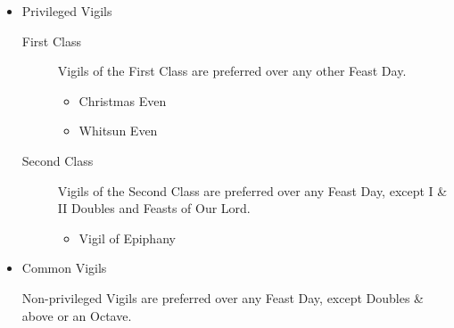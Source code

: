 \begin{itemize}
    \item Privileged Vigils\par
        \begin{description}
            \item[First Class] Vigils of the First Class are preferred over any other Feast Day.
                \begin{itemize}
                    \item Christmas Even
                    \item Whitsun Even
                \end{itemize}
            \item[Second Class] Vigils of the Second Class are preferred over any Feast Day, except I \& II Doubles and Feasts of Our Lord.
                \begin{itemize}
                    \item Vigil of Epiphany
                \end{itemize}
        \end{description}
    \item Common Vigils\par
        Non-privileged Vigils are preferred over any Feast Day, except Doubles \& above or an Octave.
\end{itemize}

%
